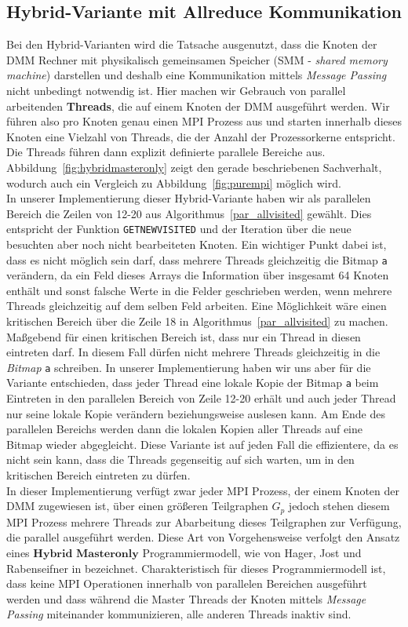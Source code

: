 \documentclass[11pt,a4paper]{article}
\begin{document}
\subsection{Hybrid-Variante mit Allreduce Kommunikation}
Bei den Hybrid-Varianten wird die Tatsache ausgenutzt, dass die Knoten der DMM Rechner mit physikalisch gemeinsamen Speicher (SMM - \textit{shared memory machine}) darstellen und deshalb eine Kommunikation mittels \textit{Message Passing} nicht unbedingt notwendig ist. Hier machen wir Gebrauch von parallel arbeitenden \textbf{Threads}, die auf einem Knoten der DMM ausgeführt werden. Wir führen also pro Knoten genau einen MPI Prozess aus und starten innerhalb dieses Knoten eine Vielzahl von Threads, die der Anzahl der Prozessorkerne entspricht. Die Threads führen dann explizit definierte parallele Bereiche aus. Abbildung~\ref{fig:hybridmasteronly} zeigt den gerade beschriebenen Sachverhalt, wodurch auch ein Vergleich zu Abbildung~\ref{fig:purempi} möglich wird.\\
In unserer Implementierung dieser Hybrid-Variante haben wir als parallelen Bereich die Zeilen von 12-20 aus Algorithmus~\ref{par_allvisited} gewählt. Dies entspricht der Funktion \lstinline{GETNEWVISITED} und der Iteration über die neue besuchten aber noch nicht bearbeiteten Knoten. Ein wichtiger Punkt dabei ist, dass es nicht möglich sein darf, dass mehrere Threads gleichzeitig die Bitmap \lstinline{a} verändern, da ein Feld dieses Arrays die Information über insgesamt 64 Knoten enthält und sonst falsche Werte in die Felder geschrieben werden, wenn mehrere Threads gleichzeitig auf dem selben Feld arbeiten. Eine Möglichkeit wäre einen kritischen Bereich über die Zeile 18 in  Algorithmus~\ref{par_allvisited} zu machen. Maßgebend für einen kritischen Bereich ist, dass nur ein Thread in diesen eintreten darf. In diesem Fall dürfen nicht mehrere Threads gleichzeitig in die \textit{Bitmap} \lstinline{a} schreiben. In unserer Implementierung haben wir uns aber für die Variante entschieden, dass jeder Thread eine lokale Kopie der Bitmap \lstinline{a} beim Eintreten in den parallelen Bereich von Zeile 12-20 erhält und auch jeder Thread nur seine lokale Kopie verändern beziehungsweise auslesen kann. Am Ende des parallelen Bereichs werden dann die lokalen Kopien aller Threads auf eine Bitmap wieder abgegleicht. Diese Variante ist auf jeden Fall die effizientere, da es nicht sein kann, dass die Threads gegenseitig auf sich warten, um in den kritischen Bereich eintreten zu dürfen.\\
In dieser Implementierung verfügt zwar jeder MPI Prozess, der einem Knoten der DMM zugewiesen ist, über einen größeren Teilgraphen \(G_{p}\) jedoch stehen diesem MPI Prozess mehrere Threads zur Abarbeitung dieses Teilgraphen zur Verfügung, die parallel ausgeführt werden. Diese Art von Vorgehensweise verfolgt den Ansatz eines \textit{$\textbf{Hybrid Masteronly}$} Programmiermodell, wie von Hager, Jost und Rabenseifner in \cite{hybrid} bezeichnet. Charakteristisch für dieses Programmiermodell ist, dass keine MPI Operationen innerhalb von parallelen Bereichen ausgeführt werden und dass während die Master Threads der Knoten mittels \textit{Message Passing} miteinander kommunizieren, alle anderen Threads inaktiv sind.\\
\end{document}
